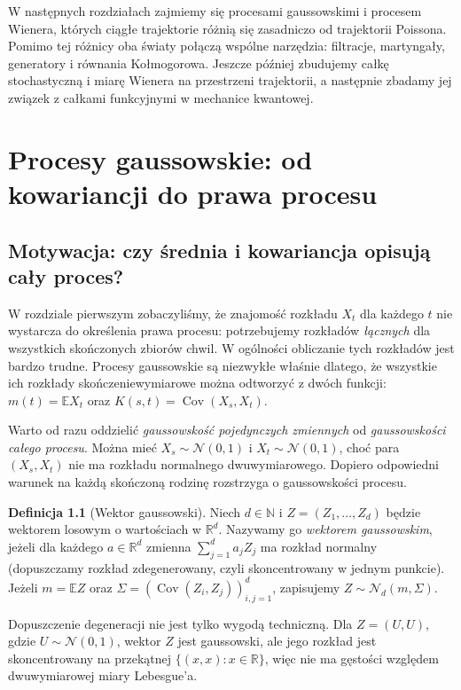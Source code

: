 \documentclass[11pt,a4paper,oneside]{report}
\numberwithin{equation}{chapter}
\theoremstyle{plain}
\theoremstyle{definition}
\newtheorem{definicja}{Definicja}[chapter]
\theoremstyle{remark}
\newcommand{\R}{\mathbb{R}}
\newcommand{\N}{\mathbb{N}}
\newcommand{\E}{\mathbb{E}}
\newcommand{\Cov}{\operatorname{Cov}}
\newcommand{\Normal}{\mathcal{N}}
\begin{document}
W następnych rozdziałach zajmiemy się procesami gaussowskimi
i procesem Wienera, których ciągłe trajektorie różnią się
zasadniczo od trajektorii Poissona. Pomimo tej różnicy
oba światy połączą wspólne narzędzia: filtracje, martyngały,
generatory i równania Kołmogorowa. Jeszcze później
zbudujemy całkę stochastyczną i miarę Wienera na przestrzeni
trajektorii, a następnie zbadamy jej związek z całkami
funkcyjnymi w mechanice kwantowej.


\chapter{Procesy gaussowskie: od kowariancji do prawa procesu}
\label{ch:gauss}

\section{Motywacja: czy średnia i kowariancja opisują cały proces?}
W rozdziale pierwszym zobaczyliśmy, że znajomość rozkładu $X_t$ dla
każdego $t$ nie wystarcza do określenia prawa procesu: potrzebujemy
rozkładów \emph{łącznych} dla wszystkich skończonych zbiorów chwil.
W ogólności obliczanie tych rozkładów jest bardzo trudne. Procesy
gaussowskie są niezwykłe właśnie dlatego, że wszystkie ich rozkłady
skończeniewymiarowe można odtworzyć z dwóch funkcji:
$m(t)=\E X_t$ oraz $K(s,t)=\Cov(X_s,X_t)$.

Warto od razu oddzielić \emph{gaussowskość pojedynczych zmiennych}
od \emph{gaussowskości całego procesu}. Można mieć $X_s\sim\Normal(0,1)$
i $X_t\sim\Normal(0,1)$, choć para $(X_s,X_t)$ nie ma rozkładu
normalnego dwuwymiarowego. Dopiero odpowiedni warunek na każdą
skończoną rodzinę rozstrzyga o gaussowskości procesu.

\begin{definicja}[Wektor gaussowski]
Niech $d\in\N$ i $Z=(Z_1,\ldots,Z_d)$ będzie wektorem losowym
o wartościach w $\R^d$. Nazywamy go \emph{wektorem gaussowskim},
jeżeli dla każdego $a\in\R^d$ zmienna $\sum_{j=1}^d a_jZ_j$
ma rozkład normalny (dopuszczamy rozkład zdegenerowany, czyli
skoncentrowany w jednym punkcie). Jeżeli $m=\E Z$ oraz
$\Sigma=(\Cov(Z_i,Z_j))_{i,j=1}^d$, zapisujemy
$Z\sim\Normal_d(m,\Sigma)$.
\end{definicja}

Dopuszczenie degeneracji nie jest tylko wygodą techniczną. Dla
$Z=(U,U)$, gdzie $U\sim\Normal(0,1)$, wektor $Z$ jest gaussowski,
ale jego rozkład jest skoncentrowany na przekątnej $\{(x,x):x\in\R\}$,
więc nie ma gęstości względem dwuwymiarowej miary Lebesgue'a.
\end{document}

